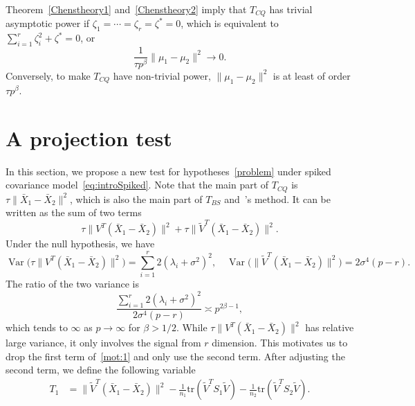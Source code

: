\documentclass[review]{elsarticle}
\DeclareMathOperator{\myVar}{Var}
\theoremstyle{plain}
\theoremstyle{definition}
\theoremstyle{remark}
\begin{document}
Theorem~\ref{Chenstheory1} and~\ref{Chenstheory2} imply that $T_{CQ}$ has trivial asymptotic power if $\zeta_1=\cdots=\zeta_r=\zeta^*=0$, which is equivalent to $\sum_{i=1}^r \zeta_i^2 +\zeta^*=0$, or
$$
\frac{1}{\tau p^\beta}\|\mu_1-\mu_2\|^2\to 0.
$$
Conversely, to make $T_{CQ}$ have non-trivial power, $\|\mu_1-\mu_2\|^2$ is at least of order $\tau p^\beta$.




\section{A projection test}\label{methodology}

In this section, we propose a new test for hypotheses~\eqref{problem} under spiked covariance model~\eqref{eq:introSpiked}.
Note that the main part of  $T_{CQ}$ is $
    \tau\|\bar{X}_1-\bar{X}_2\|^2
$, which is also the main part of $T_{BS}$ and~\cite{Ma2015A}'s method.
It can be written as the sum of two terms
\begin{equation}\label{mot:1}
    \tau \|V^T (\bar{X}_1-\bar{X}_2)\|^2+
    \tau\|\tilde{V}^T (\bar{X}_1-\bar{X}_2)\|^2.
\end{equation}
Under the null hypothesis, we have
$$\myVar\big(\tau \|V^T (\bar{X}_1-\bar{X}_2)\|^2\big)=\sum_{i=1}^r 2(\lambda_i+\sigma^2)^2,\quad 
\myVar\big(\|\tilde{V}^T (\bar{X}_1-\bar{X}_2)\|^2\big)=2\sigma^4 (p-r).$$
The ratio of the two variance is
$$
\frac{\sum_{i=1}^r 2(\lambda_i+\sigma^2)^2}{2\sigma^4 (p-r)}
\asymp
p^{2\beta-1},
$$
which tends to $\infty$ as $p\to \infty$ for $\beta>1/2$.
While $
    \tau \|V^T (\bar{X}_1-\bar{X}_2)\|^2
$ has relative large variance, it only involves the signal from $r$ dimension.
 This motivates us to drop the first term of~\eqref{mot:1} and only use the second term.
After adjusting the second term, we define the following variable
\begin{equation*}
\begin{aligned}
    T_{1}&=\|\tilde{V}^T(\bar{X}_1-\bar{X}_2)\|^2-\frac{1}{n_1}\mathrm{tr}(\tilde{V}^T S_1\tilde{V})-\frac{1}{n_2}\mathrm{tr}(\tilde{V}^T S_2\tilde{V}).
    \\
\end{aligned}
\end{equation*}
\end{document}
